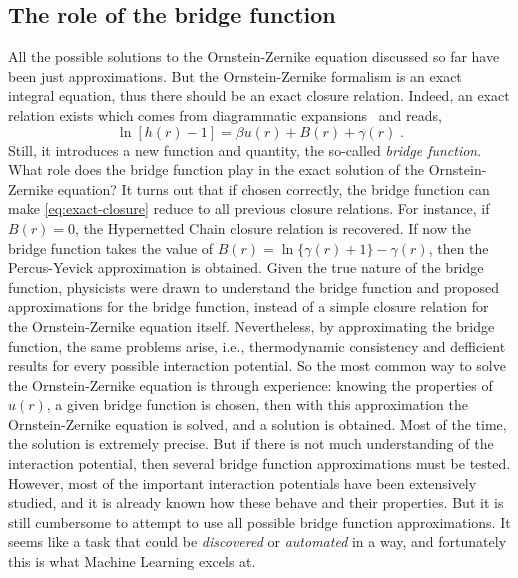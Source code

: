 \subsection{The role of the bridge function}
All the possible solutions to the Ornstein-Zernike equation discussed so far 
have been just approximations.
But the Ornstein-Zernike formalism is an exact integral equation, thus there should be an
exact closure relation. Indeed, an exact relation exists which comes from diagrammatic
expansions~\cite{hansenTheorySimpleLiquids2013} and reads,
\begin{equation}
    \ln{\left[h(r) - 1\right]} = \beta u(r) + B(r) + \gamma(r) \; .
    \label{eq:exact-closure}
\end{equation}
Still, it introduces a new function and quantity, the so-called \emph{bridge function}.
What role does the bridge function play in the exact solution of the Ornstein-Zernike
equation? It turns out that if chosen correctly, the bridge function can make
\autoref{eq:exact-closure} reduce to all previous closure relations. For instance,
if $B(r)=0$, the Hypernetted Chain closure relation is recovered. If now the bridge
function takes the value of $B(r)=\ln{ \{\gamma(r) + 1\} }-\gamma(r)$, then the 
Percus-Yevick approximation is obtained. Given the true nature of the bridge function,
physicists were drawn to understand the bridge function and proposed approximations for
the bridge function, instead of a simple closure relation for the Ornstein-Zernike
equation itself. Nevertheless, by approximating the bridge function, the same problems
arise, i.e., thermodynamic consistency and defficient results for every possible
interaction potential. So the most common way to solve the Ornstein-Zernike equation is through
experience: knowing the properties of $u(r)$, a given bridge function is chosen,
then with this approximation the Ornstein-Zernike equation is solved, and a solution is
obtained. Most of the time, the solution is extremely precise. But if there is not
much understanding of the interaction potential, then several bridge function approximations
must be tested. However, most of the important interaction potentials have been
extensively studied, and it is already known how these behave and their properties.
But it is still cumbersome to attempt to use all possible bridge function approximations.
It seems like a task that could be \emph{discovered} or \emph{automated} in a way, and
fortunately this is what Machine Learning excels at.